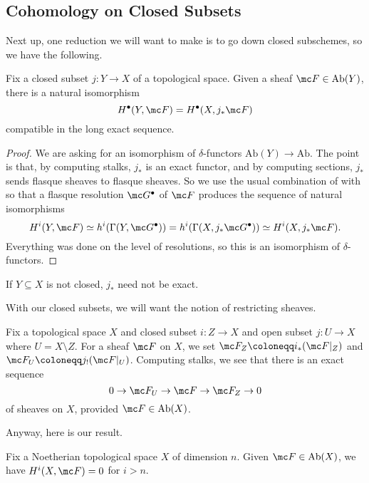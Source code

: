 \documentclass[../notes.tex]{subfiles}
\begin{document}
\subsection{Cohomology on Closed Subsets}
Next up, one reduction we will want to make is to go down closed subschemes, so we have the following.
\begin{lemma} \label{lem:closed-cohomology}
	Fix a closed subset $j\colon Y\to X$ of a topological space. Given a sheaf $\mc F\in\mathrm{Ab}(Y)$, there is a natural isomorphism
	\[H^\bullet(Y,\mc F)=H^\bullet(X,j_*\mc F)\]
	compatible in the long exact sequence.
\end{lemma}
\begin{proof}
	We are asking for an isomorphism of $\delta$-functors $\mathrm{Ab}(Y)\to\mathrm{Ab}$. The point is that, by computing stalks, $j_*$ is an exact functor, and by computing sections, $j_*$ sends flasque sheaves to flasque sheaves. So we use the usual combination of  with  so that a flasque resolution $\mc G^\bullet$ of $\mc F$ produces the sequence of natural isomorphisms
	\[H^i(Y,\mc F)\simeq h^i(\Gamma(Y,\mc G^\bullet))=h^i(\Gamma(X,j_*\mc G^\bullet))\simeq H^i(X,j_*\mc F).\]
	Everything was done on the level of resolutions, so this is an isomorphism of $\delta$-functors.
\end{proof}
\begin{remark}
	If $Y\subseteq X$ is not closed, $j_*$ need not be exact.
\end{remark}
With our closed subsets, we will want the notion of restricting sheaves.
\begin{definition}
	Fix a topological space $X$ and closed subset $i\colon Z\to X$ and open subset $j\colon U\to X$ where $U=X\setminus Z$. For a sheaf $\mc F$ on $X$, we set $\mc F_Z\coloneqq i_*(\mc F|_Z)$ and $\mc F_U\coloneqq j_!(\mc F|_U)$. Computing stalks, we see that there is an exact sequence
	\[0\to\mc F_U\to\mc F\to\mc F_Z\to0\]
	of sheaves on $X$, provided $\mc F\in\mathrm{Ab}(X)$.
\end{definition}
Anyway, here is our result.
\begin{theorem}
	Fix a Noetherian topological space $X$ of dimension $n$. Given $\mc F\in\mathrm{Ab}(X)$, we have $H^i(X,\mc F)=0$ for $i>n$.
\end{theorem}
\end{document}
